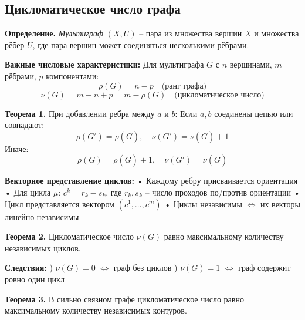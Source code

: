 \subsection{Цикломатическое число графа}

\noindent\textbf{Определение.} \textit{Мультиграф} $(X,U)$ -- пара из множества вершин $X$ и множества рёбер $U$, где пара вершин может соединяться несколькими рёбрами.

\noindent\textbf{Важные числовые характеристики:}
\noindent Для мультиграфа $G$ с $n$ вершинами, $m$ рёбрами, $p$ компонентами:
\[\rho(G) = n - p \quad \text{(ранг графа)}\]
\[\nu(G) = m - n + p = m - \rho(G) \quad \text{(цикломатическое число)}\]

\noindent\textbf{Теорема 1.} При добавлении ребра между $a$ и $b$:
\noindent Если $a,b$ соединены цепью или совпадают:
\[\rho(G') = \rho(\bar{G}), \quad \nu(G') = \nu(\bar{G}) + 1\]
\noindent Иначе:
\[\rho(G) = \rho(\bar{G}) + 1, \quad \nu(G') = \nu(\bar{G})\]

\noindent\textbf{Векторное представление циклов:}
\noindent • Каждому ребру присваивается ориентация
\noindent • Для цикла $\mu$: $c^k = r_k - s_k$, где $r_k,s_k$ -- число проходов по/против ориентации
\noindent • Цикл представляется вектором $(c^1,\ldots,c^m)$
\noindent • Циклы независимы $\Leftrightarrow$ их векторы линейно независимы

\noindent\textbf{Теорема 2.} Цикломатическое число $\nu(G)$ равно максимальному количеству независимых циклов.

\noindent\textbf{Следствия:}
) $\nu(G)=0$ $\Leftrightarrow$ граф без циклов
) $\nu(G)=1$ $\Leftrightarrow$ граф содержит ровно один цикл

\noindent\textbf{Теорема 3.} В сильно связном графе цикломатическое число равно максимальному количеству независимых контуров.